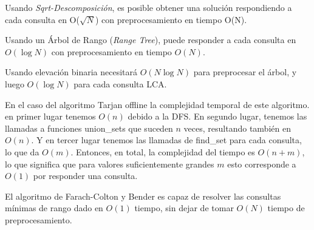 Usando {\em Sqrt-Descomposición}, es posible obtener una solución respondiendo a cada consulta en O($\sqrt{N}$) con preprocesamiento en tiempo O(N).

Usando un Árbol de Rango ({\em Range Tree}), puede responder a cada consulta en $O(\log N)$ con preprocesamiento en tiempo $O(N)$.

Usando elevación binaria necesitará $O(N \log N)$ para preprocesar el árbol, y luego $O(\log N)$ para cada consulta LCA.

En el caso del algoritmo Tarjan offline la complejidad temporal de este algoritmo. en primer lugar tenemos $O(n)$ debido a la DFS. En segundo lugar, tenemos las llamadas a funciones union\_sets que suceden $n$ veces, 
resultando también en $O(n)$. Y en tercer lugar tenemos las llamadas de find\_set para cada consulta, lo que 
da $O(m)$. Entonces, en total, la complejidad del tiempo es $O(n + m)$, lo que significa que para valores 
suficientemente grandes $m$ esto corresponde a $O(1)$ por responder una consulta.

El algoritmo de Farach-Colton y Bender  es capaz de resolver las consultas mínimas de rango dado en $O(1)$ tiempo, sin dejar de tomar $O(N)$ tiempo de preprocesamiento.